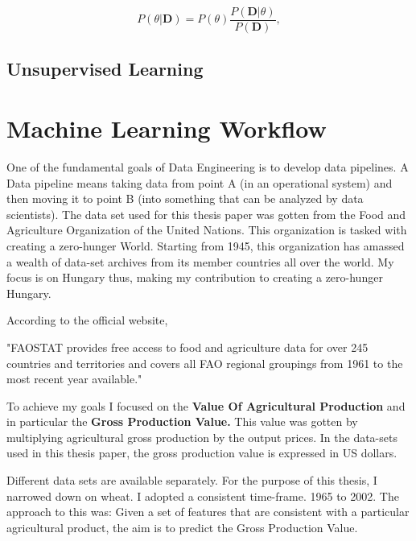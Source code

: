 \documentclass[
]{thesis-ekf}
\begin{document}
\begin{equation}
	\label{eq:bayes}
	P(\theta | \textbf{D}) = P(\theta ) \frac{P(\textbf{D} |\theta)}{P(\textbf{D})},
\end{equation}



\subsection{Unsupervised Learning}



\section{Machine Learning Workflow}
One of the fundamental goals of Data Engineering is to develop data pipelines. A Data pipeline means taking data from point A (in an operational system) and then moving it to point B (into something that can be analyzed by data scientists).
The data set used for this thesis paper was gotten from the Food and Agriculture Organization of the United Nations. This organization is tasked with creating a zero-hunger World. Starting from 1945, this organization has amassed a wealth of data-set archives from its member countries all over the world. My focus is on Hungary thus, making my contribution to creating a zero-hunger Hungary.

According to the official website,\cite{division_2000}
\begin{displayquote}
	"FAOSTAT provides free access to food and agriculture data for over 245 countries and territories and covers all FAO regional groupings from 1961 to the most recent year available."
\end{displayquote} 

To achieve my goals I focused on the \textbf{Value Of Agricultural Production} and in particular the \textbf{Gross Production Value.} This value was gotten by multiplying agricultural gross production by the output prices. In the data-sets used in this thesis paper, the gross production value is expressed in US dollars. 



Different data sets are available separately. For the purpose of this thesis, I narrowed down on wheat. I adopted a consistent time-frame. 1965 to 2002. The approach to this was: Given a set of features that are consistent with a particular agricultural product, the aim is to predict the Gross Production Value.
\end{document}
